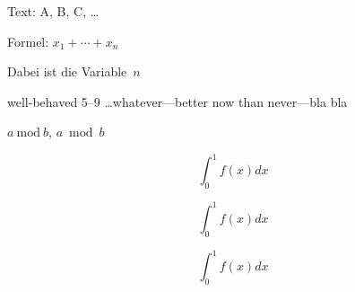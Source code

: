 \documentclass[a4paper,fleqn]{article}
\begin{document}
Text: A, B, C, \ldots

Formel: $x_1 + \cdots + x_n$

Dabei ist die Variable~$n$

well-behaved 5--9 \ldots whatever---better now than never---bla bla

$a~\mathrm{mod}~b$, $a \bmod b$

\begin{displaymath}
\int_0^1 f(x) dx  
\end{displaymath}

\begin{equation}
  \label{eq:foobar}
  \int_0^1 f(x) dx  
\end{equation}

$$ \int_0^1 f(x) dx $$
\end{document}
